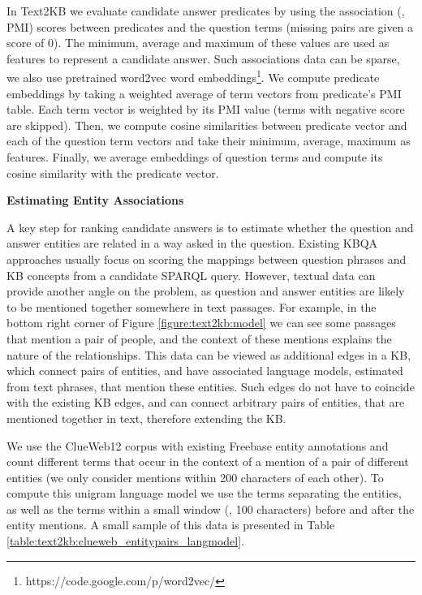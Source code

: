 In Text2KB we evaluate candidate answer predicates by using the association (\eg, PMI) scores between predicates and the question terms (missing pairs are given a score of 0).
The minimum, average and maximum of these values are used as features to represent a candidate answer.
Such associations data can be sparse, we also use pretrained word2vec word embeddings\footnote{https://code.google.com/p/word2vec/}.
We compute predicate embeddings by taking a weighted average of term vectors from predicate's PMI table.
Each term vector is weighted by its PMI value (terms with negative score are skipped).
Then, we compute cosine similarities between predicate vector and each of the question term vectors and take their minimum, average, maximum as features.
Finally, we average embeddings of question terms and compute its cosine similarity with the predicate vector.

\textbf{Estimating Entity Associations}

A key step for ranking candidate answers is to estimate whether the question and answer entities are related in a way asked in the question.
Existing KBQA approaches usually focus on scoring the mappings between question phrases and KB concepts from a candidate SPARQL query.
However, textual data can provide another angle on the problem, as question and answer entities are likely to be mentioned together somewhere in text passages.
For example, in the bottom right corner of Figure \ref{figure:text2kb:model} we can see some passages that mention a pair of people, and the context of these mentions explains the nature of the relationships.
This data can be viewed as additional edges in a KB, which connect pairs of entities, and have associated language models, estimated from text phrases, that mention these entities.
Such edges do not have to coincide with the existing KB edges, and can connect arbitrary pairs of entities, that are mentioned together in text, therefore extending the KB.

We use the ClueWeb12 corpus with existing Freebase entity annotations and count different terms that occur in the context of a mention of a pair of different entities (we only consider mentions within 200 characters of each other).
To compute this unigram language model we use the terms separating the entities, as well as the terms within a small window (\eg, 100 characters) before and after the entity mentions.
A small sample of this data is presented in Table \ref{table:text2kb:clueweb_entitypairs_langmodel}.

